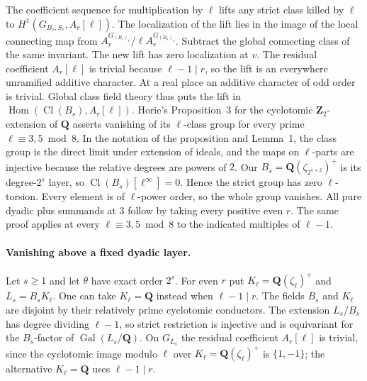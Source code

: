 The coefficient sequence for multiplication by \(\ell\) lifts any
strict class killed by \(\ell\) to
\(H^1(G_{B_s,S_\ell},A_r[\ell])\).
The localization of the lift lies in the image of the local connecting
map from \(A_r^{G_{(B_s)_v}}/\ell A_r^{G_{(B_s)_v}}\). Subtract the
global connecting class of the same invariant. The new lift has zero
localization at \(v\). The residual coefficient \(A_r[\ell]\) is
trivial because \(\ell-1\mid r\), so the lift is an everywhere
unramified additive character. At a real place an additive character
of odd order is trivial. Global class field theory thus puts the lift
in \(\operatorname{Hom}(\operatorname{Cl}(B_s),A_r[\ell])\).
Horie's Proposition~3 for the cyclotomic \(\mathbf Z_2\)-extension
of \(\mathbf Q\) asserts vanishing of its \(\ell\)-class group
for every prime \(\ell\equiv3,5\bmod8\). In the notation of the
proposition and Lemma~1, the class group is the direct limit
under extension of ideals, and the maps on \(\ell\)-parts are
injective because the relative degrees are powers of \(2\).
Our \(B_s=\mathbf Q(\zeta_{2^{s+2}})^+\) is its degree-\(2^s\)
layer, so \(\operatorname{Cl}(B_s)[\ell^\infty]=0\).
\cite[Lemma~1, p.~260, and Proposition~3, p.~289]{f2-horie-dyadic-class}
Hence the strict group has zero
\(\ell\)-torsion. Every element is of \(\ell\)-power order, so the whole
group vanishes. All pure dyadic plus summands at \(3\) follow by taking
every positive even \(r\). The same proof applies at every
\(\ell\equiv3,5\bmod8\) to the indicated multiples of \(\ell-1\).

\paragraph{Vanishing above a fixed dyadic layer.}
%
Let \(s\ge1\) and let \(\theta\) have exact order \(2^s\).
For even \(r\) put \(K_\ell=\mathbf Q(\zeta_\ell)^+\) and
\(L_s=B_sK_\ell\). One can take \(K_\ell=\mathbf Q\) instead when
\(\ell-1\mid r\). The fields \(B_s\) and \(K_\ell\) are disjoint by
their relatively prime cyclotomic conductors. The extension \(L_s/B_s\)
has degree dividing \(\ell-1\), so strict restriction is injective
and is equivariant for the \(B_s\)-factor of
\(\operatorname{Gal}(L_s/\mathbf Q)\). On \(G_{L_s}\) the
residual coefficient \(A_r[\ell]\) is trivial, since the cyclotomic
image modulo \(\ell\) over \(K_\ell=\mathbf Q(\zeta_\ell)^+\) is
\(\{1,-1\}\); the alternative \(K_\ell=\mathbf Q\) uses
\(\ell-1\mid r\).

